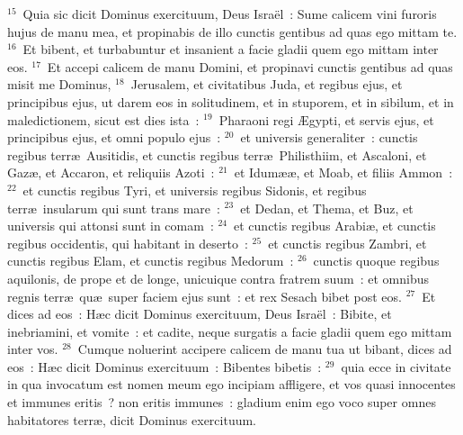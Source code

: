 ${}^{15}$~Quia sic dicit Dominus exercituum, Deus Isra\"el~: Sume calicem vini furoris hujus de manu mea, et propinabis de illo cunctis gentibus ad quas ego mittam te.
${}^{16}$~Et bibent, et turbabuntur et insanient a facie gladii quem ego mittam inter eos.
${}^{17}$~Et accepi calicem de manu Domini, et propinavi cunctis gentibus ad quas misit me Dominus,
${}^{18}$~Jerusalem, et civitatibus Juda, et regibus ejus, et principibus ejus, ut darem eos in solitudinem, et in stuporem, et in sibilum, et in maledictionem, sicut est dies ista~:
${}^{19}$~Pharaoni regi \AE gypti, et servis ejus, et principibus ejus, et omni populo ejus~:
${}^{20}$~et universis generaliter~: cunctis regibus terr\ae\ Ausitidis, et cunctis regibus terr\ae\ Philisthiim, et Ascaloni, et Gaz\ae , et Accaron, et reliquiis Azoti~:
${}^{21}$~et Idum\ae \ae , et Moab, et filiis Ammon~:
${}^{22}$~et cunctis regibus Tyri, et universis regibus Sidonis, et regibus terr\ae\ insularum qui sunt trans mare~:
${}^{23}$~et Dedan, et Thema, et Buz, et universis qui attonsi sunt in comam~:
${}^{24}$~et cunctis regibus Arabi\ae , et cunctis regibus occidentis, qui habitant in deserto~:
${}^{25}$~et cunctis regibus Zambri, et cunctis regibus Elam, et cunctis regibus Medorum~:
${}^{26}$~cunctis quoque regibus aquilonis, de prope et de longe, unicuique contra fratrem suum~: et omnibus regnis terr\ae\ qu\ae\ super faciem ejus sunt~: et rex Sesach bibet post eos.
${}^{27}$~Et dices ad eos~: H\ae c dicit Dominus exercituum, Deus Isra\"el~: Bibite, et inebriamini, et vomite~: et cadite, neque surgatis a facie gladii quem ego mittam inter vos.
${}^{28}$~Cumque noluerint accipere calicem de manu tua ut bibant, dices ad eos~: H\ae c dicit Dominus exercituum~: Bibentes bibetis~:
${}^{29}$~quia ecce in civitate in qua invocatum est nomen meum ego incipiam affligere, et vos quasi innocentes et immunes eritis~? non eritis immunes~: gladium enim ego voco super omnes habitatores terr\ae , dicit Dominus exercituum.
